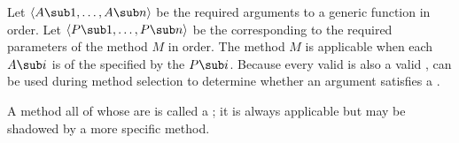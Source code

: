 Let $\langle A\sub 1, \ldots, A\sub n\rangle$ be the required
arguments to a generic function in order. Let $\langle P\sub 1,
\ldots, P\sub n\rangle$ be the  corresponding to
the required parameters of the method $M$ in order.  The method $M$ is
applicable when each $A\sub i$ is of the  specified by 
the  $P\sub i$.
Because every valid  is 
also a valid ,  can be used during method
selection to determine whether an argument satisfies a .  

A method all of whose  are 
 is called a ; it is always applicable but
may be shadowed by a more specific method.

